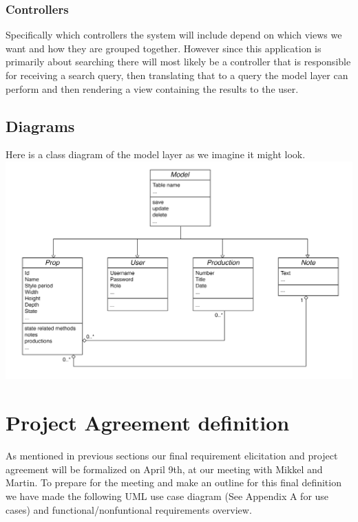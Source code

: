 \documentclass[12pt]{article}
\begin{document}
\subsubsection{Controllers}
Specifically which controllers the system will include depend on which views we
want and how they are grouped together. However since this application is
primarily about searching there will most likely be a controller that is
responsible for receiving a search query, then translating that to a query the
model layer can perform and then rendering a view containing the results to the
user.

\subsection{Diagrams}
Here is a class diagram of the model layer as we imagine it might look.
\newline
\newline
\includegraphics[scale=0.2]{class-diagram.png}

\section{Project Agreement definition}
As mentioned in previous sections our final requirement elicitation and project agreement will be formalized on April 9th, at our meeting with Mikkel and Martin. To prepare for the meeting and make an outline for this final definition we have made the following UML use case diagram (See Appendix A for use cases) and functional/nonfuntional requirements overview.
\end{document}
